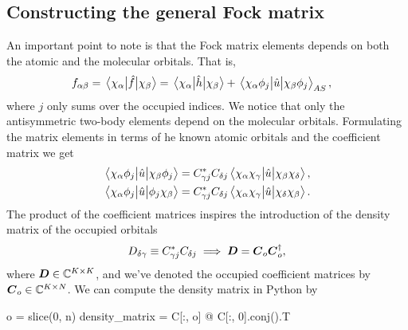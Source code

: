         \subsection{Constructing the general Fock matrix}
            An important point to note is that the Fock matrix elements depends
            on both the atomic and the molecular orbitals.
            That is,
            \begin{align}
                f_{\alpha\beta}
                &= \mel{\chi_{\alpha}}{\hat{f}}{\chi_{\beta}}
                = \mel{\chi_{\alpha}}{\hat{h}}{\chi_{\beta}}
                +
                \mel{\chi_{\alpha}\phi_j}{\hat{u}}{\chi_{\beta}\phi_j}_{AS},
            \end{align}
            where $j$ only sums over the occupied indices.
            We notice that only the antisymmetric two-body elements depend on
            the molecular orbitals.
            Formulating the matrix elements in terms of he known atomic orbitals
            and the coefficient matrix we get
            \begin{align}
                \mel{\chi_{\alpha}\phi_j}{\hat{u}}{\chi_{\beta}\phi_j}
                &=
                C^{*}_{\gamma j} C_{\delta j}
                \mel{\chi_{\alpha}\chi_{\gamma}}{\hat{u}}{\chi_{\beta}\chi_{\delta}},
                \\
                \mel{\chi_{\alpha}\phi_j}{\hat{u}}{\phi_j\chi_{\beta}}
                &=
                C^{*}_{\gamma j} C_{\delta j}
                \mel{\chi_{\alpha}\chi_{\gamma}}{\hat{u}}{\chi_{\delta}\chi_{\beta}}.
            \end{align}
            The product of the coefficient matrices inspires the introduction of
            the density matrix of the occupied orbitals
            \begin{align}
                D_{\delta\gamma} \equiv
                C^{*}_{\gamma j} C_{\delta j}
                \implies
                \boldsymbol{D} = \boldsymbol{C}_{o}\boldsymbol{C}^{\dagger}_{o},
                \label{eq:ghf-density-matrix}
            \end{align}
            where $\boldsymbol{D} \in \mathbb{C}^{K \times K}$, and we've denoted the
            occupied coefficient matrices by $\boldsymbol{C}_o \in \mathbb{C}^{K \times
            N}$.
            We can compute the density matrix in Python by
            \begin{python}
o = slice(0, n)
density_matrix = C[:, o] @ C[:, 0].conj().T
            \end{python}
